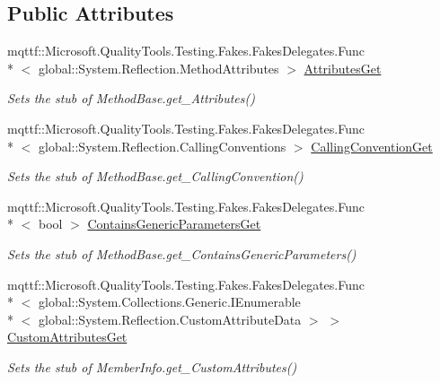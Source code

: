 \subsection*{Public Attributes}
\begin{DoxyCompactItemize}
\item 
mqttf\-::\-Microsoft.\-Quality\-Tools.\-Testing.\-Fakes.\-Fakes\-Delegates.\-Func\\*
$<$ global\-::\-System.\-Reflection.\-Method\-Attributes $>$ \hyperlink{class_system_1_1_reflection_1_1_fakes_1_1_stub_constructor_info_a7d2c9bedd2ac28bf9e29870e5d72a78e}{Attributes\-Get}
\begin{DoxyCompactList}\small\item\em Sets the stub of Method\-Base.\-get\-\_\-\-Attributes()\end{DoxyCompactList}\item 
mqttf\-::\-Microsoft.\-Quality\-Tools.\-Testing.\-Fakes.\-Fakes\-Delegates.\-Func\\*
$<$ global\-::\-System.\-Reflection.\-Calling\-Conventions $>$ \hyperlink{class_system_1_1_reflection_1_1_fakes_1_1_stub_constructor_info_a48d575add7a603461fdbd10a599e68f3}{Calling\-Convention\-Get}
\begin{DoxyCompactList}\small\item\em Sets the stub of Method\-Base.\-get\-\_\-\-Calling\-Convention()\end{DoxyCompactList}\item 
mqttf\-::\-Microsoft.\-Quality\-Tools.\-Testing.\-Fakes.\-Fakes\-Delegates.\-Func\\*
$<$ bool $>$ \hyperlink{class_system_1_1_reflection_1_1_fakes_1_1_stub_constructor_info_a53d126a809630d4bdc8acdbf021fb789}{Contains\-Generic\-Parameters\-Get}
\begin{DoxyCompactList}\small\item\em Sets the stub of Method\-Base.\-get\-\_\-\-Contains\-Generic\-Parameters()\end{DoxyCompactList}\item 
mqttf\-::\-Microsoft.\-Quality\-Tools.\-Testing.\-Fakes.\-Fakes\-Delegates.\-Func\\*
$<$ global\-::\-System.\-Collections.\-Generic.\-I\-Enumerable\\*
$<$ global\-::\-System.\-Reflection.\-Custom\-Attribute\-Data $>$ $>$ \hyperlink{class_system_1_1_reflection_1_1_fakes_1_1_stub_constructor_info_a8c3e7f272756c60d11d5d567b5dee18e}{Custom\-Attributes\-Get}
\begin{DoxyCompactList}\small\item\em Sets the stub of Member\-Info.\-get\-\_\-\-Custom\-Attributes()\end{DoxyCompactList}\item 

\end{DoxyCompactItemize}
